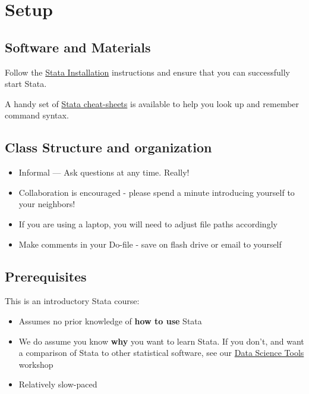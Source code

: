 \documentclass[
]{book}
\providecommand{\tightlist}{%
  \setlength{\itemsep}{0pt}\setlength{\parskip}{0pt}}
\begin{document}
\hypertarget{setup-6}{%
\section{Setup}\label{setup-6}}

\hypertarget{software-and-materials-6}{%
\subsection{Software and Materials}\label{software-and-materials-6}}

Follow the \href{./StataInstall.html}{Stata Installation} instructions and ensure that you can successfully start Stata.

A handy set of \href{Stata/StataIntro/stata-cheat-sheets.pdf}{Stata cheat-sheets} is available to help you look up and remember command syntax.

\hypertarget{class-structure-and-organization}{%
\subsection{Class Structure and organization}\label{class-structure-and-organization}}

\begin{itemize}
\tightlist
\item
  Informal --- Ask questions at any time. Really!
\item
  Collaboration is encouraged - please spend a minute introducing yourself to your neighbors!
\item
  If you are using a laptop, you will need to adjust file paths accordingly
\item
  Make comments in your Do-file - save on flash drive or email to yourself
\end{itemize}

\hypertarget{prerequisites-6}{%
\subsection{Prerequisites}\label{prerequisites-6}}

This is an introductory Stata course:

\begin{itemize}
\tightlist
\item
  Assumes no prior knowledge of \textbf{how to use} Stata
\item
  We do assume you know \textbf{why} you want to learn Stata. If you don't, and want a comparison of Stata to other statistical software, see our \href{./DataScienceTools.html}{Data Science Tools} workshop
\item
  Relatively slow-paced
\end{itemize}
\end{document}

